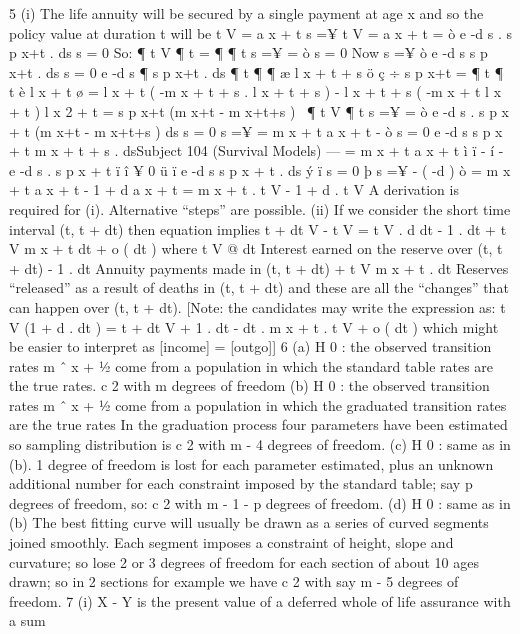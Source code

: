 5
(i)
The life annuity will be secured by a single payment at age x and so the
policy value at duration t will be
t V
= a x + t
s =¥
t V
= a x + t =
ò
e -d s . s p x+t . ds
s = 0
So:
¶
t V
¶ t
=
¶
¶ t
s =¥
=
ò
s = 0
Now
s =¥
ò
e -d s s p x+t . ds
s = 0
e -d s
¶
s p x+t . ds
¶ t
¶
¶ æ l x + t + s ö
ç
÷
s p x+t =
¶ t
¶ t è l x + t ø
=
l x + t ( -m x + t + s . l x + t + s ) - l x + t + s ( -m x + t l x + t )
l x 2 + t
= s p x+t (m x+t - m x+t+s )
\
¶
t V
¶ t
s =¥
=
ò
e -d s . s p x + t (m x+t - m x+t+s ) ds
s = 0
s =¥
= m x + t a x + t -
ò
s = 0
e -d s s p x + t m x + t + s . dsSubject 104 (Survival Models) — %
= m x + t a x + t
ì
ï
- í - e -d s . s p x + t
ï
î
¥
0
ü
ï
e -d s s p x + t . ds ý
ï
s = 0
þ
s =¥
- ( -d )
ò
= m x + t a x + t - 1 + d a x + t
= m x + t . t V - 1 + d . t V
A derivation is required for (i). Alternative “steps” are possible.
(ii)
If we consider the short time interval (t, t + dt) then equation implies
t + dt V
- t V = t V . d dt - 1 . dt + t V m x + t dt + o ( dt )
where
t V @ dt Interest earned on the reserve over (t, t + dt)
- 1 . dt Annuity payments made in (t, t + dt)
+ t V m x + t . dt Reserves “released” as a result of deaths
in (t, t + dt)
and these are all the “changes” that can happen over (t, t + dt).
[Note: the candidates may write the expression as:
t V (1
+ d . dt ) =
t + dt V
+ 1 . dt - dt . m x + t . t V + o ( dt )
which might be easier to interpret as [income] = [outgo]]
6
(a)
H 0 : the observed transition rates m ˆ x + 1⁄2 come from a population in which
the standard table rates are the true rates.
c 2 with m degrees of freedom
(b)
H 0 : the observed transition rates m ˆ x + 1⁄2 come from a population in which
the graduated transition rates are the true rates
In the graduation process four parameters have been estimated so
sampling distribution is c 2 with m - 4 degrees of freedom.
(c)
H 0 : same as in (b).
1 degree of freedom is lost for each parameter estimated, plus an
unknown additional number for each constraint imposed by the standard
table; say p degrees of freedom, so:
c 2 with m - 1 - p degrees of freedom.
(d)
H 0 : same as in (b)
The best fitting curve will usually be drawn as a series of curved segments
joined smoothly.
Each segment imposes a constraint of height, slope and curvature; so lose
2 or 3 degrees of freedom for each section of about 10 ages drawn; so in 2
sections for example we have
c 2 with say m - 5 degrees of freedom.
7
(i) X - Y is the present value of a deferred whole of life assurance with a sum

